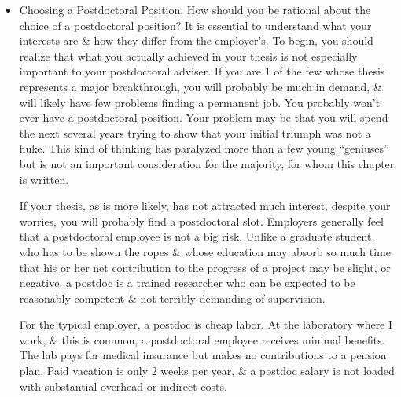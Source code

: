 \documentclass{article}
\begin{document}
\begin{enumerate}
\begin{itemize}
\begin{itemize}
			Often a prominent scientist will lead a big group with, say, 15 or 20 experimental systems, enabling an equal number of graduate students to study trends. These students are guaranteed to finish their degrees in a reasonable period of time. In total contrast to my own graduate student experience, they are assigned very specific problems. They take their data, report their results, \& get their degrees. It all seems so easy. Should you be part of this kind of group? Again, the issue is whether the students have an inkling of the big picture. Is it only the adviser who knows what trend is being studied, while student A. is looking at rhodium, B. has a sample of ruthenium, \& C. has some palladium? If the students cannot tell a good story, move on.
			\item {\sf Choosing a Postdoctoral Position.} How should you be rational about the choice of a postdoctoral position? It is essential to understand what your interests are \& how they differ from the employer's. To begin, you should realize that what you actually achieved in your thesis is not especially important to your postdoctoral adviser. If you are 1 of the few whose thesis represents a major breakthrough, you will probably be much in demand, \& will likely have few problems finding a permanent job. You probably won't ever have a postdoctoral position. Your problem may be that you will spend the next several years trying to show that your initial triumph was not a fluke. This kind of thinking has paralyzed more than a few young ``geniuses'' but is not an important consideration for the majority, for whom this chapter is written.

			If your thesis, as is more likely, has not attracted much interest, despite your worries, you will probably find a postdoctoral slot. Employers generally feel that a postdoctoral employee is not a big risk. Unlike a graduate student, who has to be shown the ropes \& whose education may absorb so much time that his or her net contribution to the progress of a project may be slight, or negative, a postdoc is a trained researcher who can be expected to be reasonably competent \& not terribly demanding of supervision.

			For the typical employer, a postdoc is cheap labor. At the laboratory where I work, \& this is common, a postdoctoral employee receives minimal benefits. The lab pays for medical insurance but makes no contributions to a pension plan. Paid vacation is only 2 weeks per year, \& a postdoc salary is not loaded with substantial overhead or indirect costs.


\end{itemize}
\end{itemize}
\end{enumerate}
\end{document}
